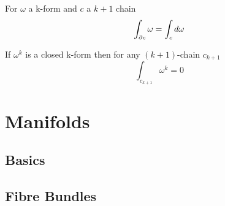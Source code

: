 \documentclass{article}
\begin{document}
\begin{theorem}
For $\omega$ a k-form and $c$ a $k+1$ chain 
\[
\int_{\partial c} \omega = \int_c d\omega
\]
\end{theorem}

\begin{corollary}
If $\omega^k$ is a closed k-form then for any $(k+1)$-chain $c_{k+1}$
\[
\int_{c_{k+1}} \omega^k = 0
\]
\end{corollary}



\section{Manifolds}

\subsection{Basics}


\subsection{Fibre Bundles}
\end{document}
